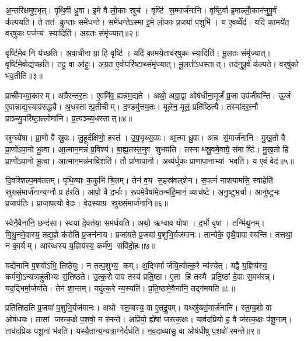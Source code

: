 अ॒न्तरि॑क्षमुप॒भृत्। पृ॒थि॒वी ध्रु॒वा। इ॒मे वै लो॒काः स्रुच॑। वृष्टि॑ स॒म्मार्ज॑नानि। वृष्टि॒र्वा इ॒माल्लोँ॒कान॑नुपू॒र्वं क॑ल्पयति। ते तत॑ कॢ॒प्ताः समे॑धन्ते। समे॑धन्तेऽस्मा इ॒मे लो॒काः प्र॒जया॑ प॒शुभि॑। य ए॒वव्वेँद॑। यदि॑ का॒मये॑त॒ वर्‌षु॑कः प॒र्जन्य॑ स्या॒दिति॑। अ॒ग्र॒तः संमृ॑ज्यात्॥२॥

वृष्टि॑मे॒व नि य॑च्छति। अ॒वा॒चीनाग्रा॒ हि वृष्टि॑। यदि॑ का॒मये॒ताव॑र्‌षुकः स्या॒दिति॑। मू॒ल॒तः संमृ॑ज्यात्। वृष्टि॑मे॒वोद्य॑च्छति। तदु॒ वा आ॑हुः। अ॒ग्र॒त ए॒वोपरि॑ष्टा॒थ्संमृ॑ज्यात्। मू॒ल॒तो॑ऽधस्तात्। तद॑नुपू॒र्वं क॑ल्पते। वर्‌षु॑को भव॒तीति॑॥३॥

प्राची॑मभ्या॒कारम्। अग्रै॑रन्तर॒तः। ए॒वमि॑व॒ ह्यन्न॑म॒द्यते। अथो॒ अग्रा॒द्वा ओष॑धीना॒मूर्जं॑ प्र॒जा उप॑जीवन्ति। ऊ॒र्ज ए॒वान्नाद्य॒स्याव॑रुद्ध्यै। अ॒धस्तात्प्र॒तीचीम्। द॒ण्डमु॑त्तम॒तः। मूले॑न॒ मूलं॒ प्रति॑ष्ठित्यै। तस्मा॑दर॒त्नौ प्राञ्च्यु॒परि॑ष्टा॒ल्लोमा॑नि। प्र॒त्यञ्च्य॒धस्तात्॥४॥

स्रुग्घ्ये॑षा। प्रा॒णो वै स्रु॒वः। जु॒हूर्दक्षि॑णो॒ हस्त॑। उ॒प॒भृथ्स॒व्यः। आ॒त्मा ध्रु॒वा। अन्न सं॒मार्ज॑नानि। मु॒ख॒तो वै प्रा॒णो॑ऽपा॒नो भू॒त्वा। आ॒त्मान॒मन्नं॑ प्र॒विश्य॑। बा॒ह्य॒तस्त॒नुव शुभयति। तस्माथ्स्रु॒वमे॒वाग्रे॒ संमार्ष्टि। मु॒ख॒तो हि प्रा॒णो॑ऽपा॒नो भू॒त्वा। आ॒त्मान॒मन्न॑मावि॒शति॑। तौ प्रा॑णापा॒नौ। अव्य॑र्धुकः प्राणापा॒नाभ्यां भवति। य ए॒वं वेद॑॥५॥\anuvakamend[जु॒हूर्मृ॑ज्याद्भव॒तीति॑ प्र॒त्यञ्च्य॒धस्तान्मार्ष्टि॒ पञ्च॑ च]

दि॒वश्शिल्प॒मव॑ततम्। पृ॒थि॒व्याः क॒कुभि॑ श्रि॒तम्। तेन॑ व॒य स॒हस्र॑वल्‌शेन। स॒पत्नं॑ नाशयामसि॒ स्वाहेति॑ स्रुख्सं॒मार्ज॑नान्य॒ग्नौ प्र ह॑रति। आपो॒ वै द॒र्भाः। रू॒पमे॒वैषा॑मे॒तन्म॑हि॒मानं॒ व्याच॑ष्टे। अ॒नु॒ष्टुभ॒र्चा। आनु॑ष्टुभः प्र॒जाप॑तिः। प्रा॒जा॒प॒त्यो वे॒दः। वे॒दस्याग्र स्रुख्सं॒मार्ज॑नानि॥६॥

स्वेनै॒वैना॑नि॒ छन्द॑सा। स्वया॑ दे॒वत॑या॒ सम॑र्धयति। अथो॒ ऋग्वाव योषा। द॒र्भो वृषा। तन्मि॑थु॒नम्। मि॒थु॒नमे॒वास्य॒ तद्य॒ज्ञे क॑रोति प्र॒जन॑नाय। प्रजा॑यते प्र॒जया॑ प॒शुभि॒र्यज॑मानः। तान्येके॒ वृथै॒वापास्यन्ति। तत्तथा॒ न का॒र्यम्। आर॑ब्धस्य य॒ज्ञिय॑स्य॒ कर्म॑ण॒ सवि॑दो॒हः॥७॥

यद्ये॑नानि प॒शवो॑ऽभि॒ तिष्ठे॑युः। न तत्प॒शुभ्य॒ कम्। अ॒द्भिर्मार्जयि॒त्वोत्क॒रे न्य॑स्येत्। यद्वै य॒ज्ञिय॑स्य॒ कर्म॑णो॒ऽन्यत्राहु॑तीभ्यः सं॒तिष्ठ॑ते। उ॒त्क॒रो वाव तस्य॑ प्रति॒ष्ठा। ए॒ता हि तस्मै प्रति॒ष्ठां दे॒वाः स॒मभ॑रन्न्। यद॒द्भिर्मा॒र्जय॑ति। तेन॑ शा॒न्तम्। यदु॑त्क॒रे न्य॒स्यति॑। प्र॒ति॒ष्ठामे॒वैना॑नि॒ तद्ग॑मयति॥८॥

प्रति॑तिष्ठति प्र॒जया॑ प॒शुभि॒र्यज॑मानः। अथो स्त॒म्बस्य॒ वा ए॒तद्रू॒पम्। यथ्स्रु॑ख्सं॒मार्ज॑नानि। स्त॒म्ब॒शो वा ओष॑धयः। तासां जरत्क॒क्षे प॒शवो॒ न र॑मन्ते। अप्रि॑यो॒ ह्ये॑षां जरत्क॒क्षः। याव॑दप्रियो ह॒ वै ज॑रत्क॒क्षः प॑शू॒नाम्। ताव॑दप्रियः पशू॒नां भ॑वति। यस्यै॒तान्य॒न्यत्रा॒ग्नेर्दध॑ति। न॒व॒दाव्या॑सु॒ वा ओष॑धीषु प॒शवो॑ रमन्ते॥९॥

